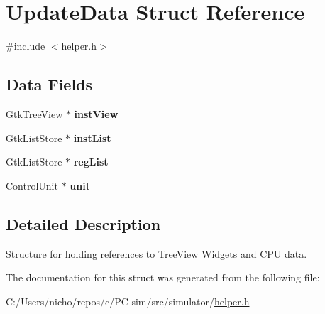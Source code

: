 \hypertarget{struct_update_data}{}\section{Update\+Data Struct Reference}
\label{struct_update_data}


{\ttfamily \#include $<$helper.\+h$>$}

\subsection*{Data Fields}
\begin{DoxyCompactItemize}
\item 
Gtk\+Tree\+View $\ast$ {\bfseries inst\+View}\hypertarget{struct_update_data_ac0dd0f7489c2628ffd5e94e3ea3727d3}{}\label{struct_update_data_ac0dd0f7489c2628ffd5e94e3ea3727d3}

\item 
Gtk\+List\+Store $\ast$ {\bfseries inst\+List}\hypertarget{struct_update_data_a68c5a7482deacde6700ee117dd7d09bb}{}\label{struct_update_data_a68c5a7482deacde6700ee117dd7d09bb}

\item 
Gtk\+List\+Store $\ast$ {\bfseries reg\+List}\hypertarget{struct_update_data_ab346f7795b5d9c7037de31b61c54f917}{}\label{struct_update_data_ab346f7795b5d9c7037de31b61c54f917}

\item 
Control\+Unit $\ast$ {\bfseries unit}\hypertarget{struct_update_data_aef46f952d07fd9f4be393243758f7f81}{}\label{struct_update_data_aef46f952d07fd9f4be393243758f7f81}

\end{DoxyCompactItemize}


\subsection{Detailed Description}
Structure for holding references to Tree\+View Widgets and C\+PU data. 

The documentation for this struct was generated from the following file\+:\begin{DoxyCompactItemize}
\item 
C\+:/\+Users/nicho/repos/c/\+P\+C-\/sim/src/simulator/\hyperlink{helper_8h}{helper.\+h}\end{DoxyCompactItemize}
